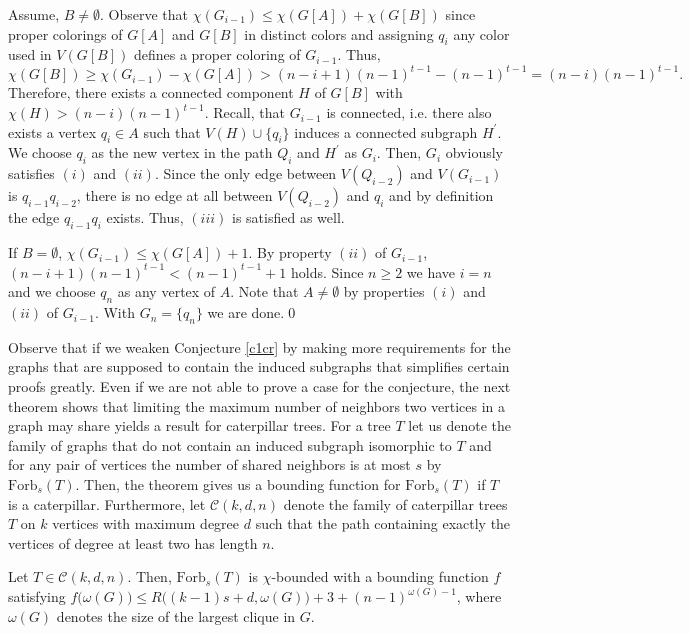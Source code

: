 \begin{prf}
Assume, $B\neq\emptyset$. Observe that $\chi (G_{i-1})\leq \chi (G[A]) + \chi (G[B])$ since proper colorings of $G[A]$ and $G[B]$ in distinct colors and assigning $q_i$ any color used in $V(G[B])$ defines a proper coloring of $G_{i-1}$. Thus, \[\chi (G[B])\geq \chi (G_{i-1})-\chi (G[A])>(n-i+1)(n-1)^{t-1}-(n-1)^{t-1}=(n-i)(n-1)^{t-1}.\]
Therefore, there exists a connected component $H$ of $G[B]$ with $\chi (H)>(n-i)(n-1)^{t-1}$. Recall, that $G_{i-1}$ is connected, i.e. there also exists a vertex $q_i\in A$ such that $V(H)\cup \{q_i\}$ induces a connected subgraph $H^\prime$. We choose $q_i$ as the new vertex in the path $Q_i$ and $H^\prime$ as $G_i$. Then, $G_i$ obviously satisfies $(i)$ and $(ii)$. Since the only edge between $V(Q_{i-2})$ and $V(G_{i-1})$ is $q_{i-1}q_{i-2}$, there is no edge at all between $V(Q_{i-2})$ and $q_i$ and by definition the edge $q_{i-1}q_i$ exists. Thus, $(iii)$ is satisfied as well. 

If $B=\emptyset$, $\chi (G_{i-1})\leq \chi (G[A]) + 1$. By property $(ii)$ of $G_{i-1}$, $(n-i+1)(n-1)^{t-1} < (n-1)^{t-1} +1$ holds. Since $n\geq 2$ we have $i=n$ and we choose $q_n$ as any vertex of $A$. Note that $A\neq\emptyset$ by properties $(i)$ and $(ii)$ of $G_{i-1}$. With $G_n=\{q_n\}$ we are done.\qed
\end{prf}


Observe that if we weaken Conjecture \ref{c1cr} by making more requirements for the graphs that are supposed to contain the induced subgraphs that simplifies certain proofs greatly. Even if we are not able to prove a case for the conjecture, the next theorem shows that limiting the maximum number of neighbors two vertices in a graph may share yields a result for caterpillar trees. For a tree $T$ let us denote the family of graphs that do not contain an induced subgraph isomorphic to $T$ and for any pair of vertices the number of shared neighbors is at most $s$ by $\text{Forb}_s(T)$. Then, the theorem gives us a bounding function for $\text{Forb}_s(T)$ if $T$ is a caterpillar. Furthermore, let $\mathcal{C}(k,d,n)$ denote the family of caterpillar trees $T$ on $k$ vertices with maximum degree $d$ such that the path containing exactly the vertices of degree at least two has length $n$.

\begin{thm}
Let $T\in \mathcal{C}(k,d,n)$. Then, $\text{Forb}_s(T)$ is $\chi$-bounded with a bounding function $f$ satisfying $f\big(\omega (G)\big)\leq R\big( ( k-1) s+d, \omega (G) \big) +3+ ( n-1) ^{\omega (G)-1}$, where $\omega (G)$ denotes the size of the largest clique in $G$.
\end{thm}

